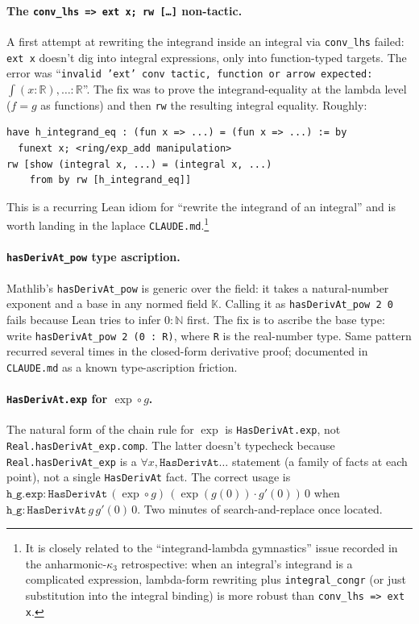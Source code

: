 \documentclass[11pt]{article}
\begin{document}
\paragraph{The \texttt{conv\_lhs => ext x; rw [\dots]} non-tactic.}
A first attempt at rewriting the integrand inside an integral via
\texttt{conv\_lhs} failed: \texttt{ext x} doesn't dig into integral
expressions, only into function-typed targets. The error was
``\texttt{invalid 'ext' conv tactic, function or arrow expected:
\(\int (x : \mathbb{R}), \dots : \mathbb{R}\)}''. The fix was to
prove the integrand-equality at the lambda level
($f = g$ as functions) and then \texttt{rw} the resulting integral
equality. Roughly:

\begin{verbatim}
have h_integrand_eq : (fun x => ...) = (fun x => ...) := by
  funext x; <ring/exp_add manipulation>
rw [show (integral x, ...) = (integral x, ...)
    from by rw [h_integrand_eq]]
\end{verbatim}

This is a recurring Lean idiom for ``rewrite the integrand of an
integral'' and is worth landing in the laplace
\texttt{CLAUDE.md}.\footnote{It is closely related to the
``integrand-lambda gymnastics'' issue recorded in the
anharmonic-$\kappa_3$ retrospective: when an integral's integrand is
a complicated expression, lambda-form rewriting plus
\texttt{integral\_congr} (or just substitution into the integral
binding) is more robust than \texttt{conv\_lhs => ext x}.}

\paragraph{\texttt{hasDerivAt\_pow} type ascription.} Mathlib's
\texttt{hasDerivAt\_pow} is generic over the field: it takes a
natural-number exponent and a base in any normed field $\mathbb{K}$.
Calling it as \texttt{hasDerivAt\_pow 2 0} fails because Lean tries
to infer $0 : \mathbb{N}$ first. The fix is to ascribe the base
type: write \texttt{hasDerivAt\_pow 2 (0 : R)}, where \texttt{R} is
the real-number type. Same pattern recurred several times in the
closed-form derivative proof; documented in \texttt{CLAUDE.md} as a
known type-ascription friction.

\paragraph{\texttt{HasDerivAt.exp} for $\exp \circ g$.} The natural
form of the chain rule for $\exp$ is \texttt{HasDerivAt.exp}, not
\texttt{Real.hasDerivAt\_exp.comp}. The latter doesn't typecheck
because \texttt{Real.hasDerivAt\_exp} is a $\forall x, \texttt{HasDerivAt}\dots$
statement (a family of facts at each point), not a single
\texttt{HasDerivAt} fact. The correct usage is
$\texttt{h\_g.exp} : \texttt{HasDerivAt}\,(\exp \circ g)\, (\exp(g(0)) \cdot g'(0))\,0$
when $\texttt{h\_g} : \texttt{HasDerivAt}\,g\,g'(0)\,0$. Two minutes
of search-and-replace once located.
\end{document}
